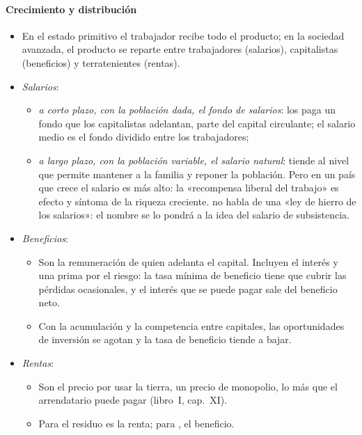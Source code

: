 \documentclass[11pt]{article}
\begin{document}
\paragraph{Crecimiento y distribución}\label{sec:smith-distribucion}
\begin{itemize}
\item En el estado primitivo el trabajador recibe todo el producto; en la sociedad avanzada, el producto se reparte entre trabajadores (salarios), capitalistas (beneficios) y terratenientes (rentas).
\item \emph{Salarios}:
  \begin{itemize}
  \item \emph{a corto plazo, con la población dada, el fondo de salarios}: los paga un fondo que los capitalistas adelantan, parte del capital circulante; el salario medio es el fondo dividido entre los trabajadores;
  \item \emph{a largo plazo, con la población variable, el salario natural}: tiende al nivel que permite mantener a la familia y reponer la población. Pero en un país que crece el salario es más alto: la «recompensa liberal del trabajo» es efecto y síntoma de la riqueza creciente\nocite{Smith1776Wealth}.  no habla de una «ley de hierro de los salarios»: el nombre se lo pondrá \textcite{Lassalle1863Antwortschreiben} a la idea del salario de subsistencia.
  \end{itemize}
\item \emph{Beneficios}:
  \begin{itemize}
  \item Son la remuneración de quien adelanta el capital. Incluyen el interés y una prima por el riesgo: la tasa mínima de beneficio tiene que cubrir las pérdidas ocasionales, y el interés que se puede pagar sale del beneficio neto\nocite{Smith1776Wealth}.
  \item Con la acumulación y la competencia entre capitales, las oportunidades de inversión se agotan y la tasa de beneficio tiende a bajar.
  \end{itemize}
\item \emph{Rentas}:
  \begin{itemize}
  \item Son el precio por usar la tierra, un precio de monopolio, lo más que el arrendatario puede pagar (libro~I, cap.~XI).
  \item Para  el residuo es la renta; para , el beneficio.
  \end{itemize}
\end{itemize}
\end{document}
